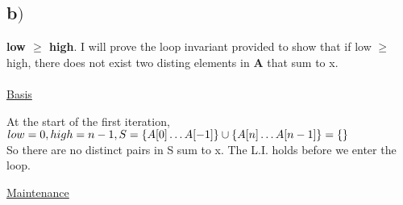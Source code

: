 \documentclass[a4paper,12pt]{article}
\begin{document}
\subsection*{b\()\)}
{\bf low \(\ge\) high}. I will prove the loop invariant provided to show that if low \(\ge\) high, 
there does not exist two disting elements in {\bf A} that sum to x.\\\\
\underline{Basis}
\begin{indentpar}{1cm}
  At the start of the first iteration,\\
  \(low = 0, high = n-1,\\ 
  S = \{A[0]\dots A[-1]\} \cup \{A[n] \dots A[n-1]\} = \{\}\)\\
  So there are no distinct pairs in S sum to x. The L.I. holds before we enter the loop.
\end{indentpar}
\underline{Maintenance}
\end{document}
